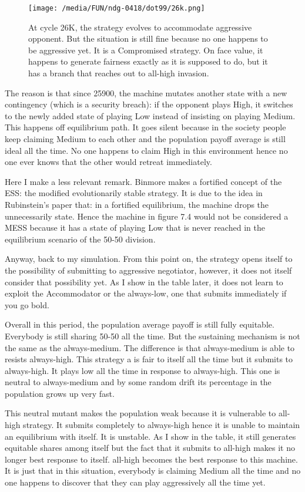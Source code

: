 \documentclass[12.5pt]{report}
\begin{document}
\begin{figure}[h!]
\center
\texttt{[image: /media/FUN/ndg-0418/dot99/26k.png]}
\caption{At cycle 26K, the strategy evolves to accommodate aggressive opponent. But the situation is still fine because no one happens to be aggressive yet. It is a Compromised strategy. On face value, it happens to generate fairness exactly as it is supposed to do, but it has a branch that reaches out to all-high invasion.}
\end{figure}

The reason is that since 25900, the machine mutates another state with a new contingency (which is a security breach): if the opponent plays High, it switches to the newly added state of playing Low instead of insisting on playing Medium. This happens off equilibrium path. It goes silent because in the society people keep claiming Medium to each other and the population payoff average is still ideal all the time. No one happens to claim High in this environment hence no one ever knows that the other would retreat immediately.

Here I make a less relevant remark. Binmore makes a fortified concept of the ESS: the modified evolutionarily stable strategy. It is due to the idea in Rubinstein's paper that: in a fortified equilibrium, the machine drops the unnecessarily state. Hence the machine in figure 7.4 would not be considered a MESS because it has a state of playing Low that is never reached in the equilibrium scenario of the 50-50 division.

Anyway, back to my simulation. From this point on, the strategy opens itself to the possibility of submitting to aggressive negotiator, however, it does not itself consider that possibility yet. As I show in the table later, it does not learn to exploit the Accommodator or the always-low, one that submits immediately if you go bold.

Overall in this period, the population average payoff is still fully equitable. Everybody is still sharing 50-50 all the time. But the sustaining mechanism is not the same as the always-medium. The difference is that always-medium is able to resists always-high. This strategy a is fair to itself all the time but it submits to always-high. It plays low all the time in response to always-high. This one is neutral to always-medium and by some random drift its percentage in the population grows up very fast.

This neutral mutant makes the population weak because it is vulnerable to all-high strategy. It submits completely to always-high hence it is unable to maintain an equilibrium with itself. It is unstable. As I show in the table, it still generates equitable shares among itself but the fact that it submits to all-high makes it no longer best response to itself. all-high becomes the best response to this machine. It is just that in this situation, everybody is claiming Medium all the time and no one happens to discover that they can play aggressively all the time yet.
\end{document}
